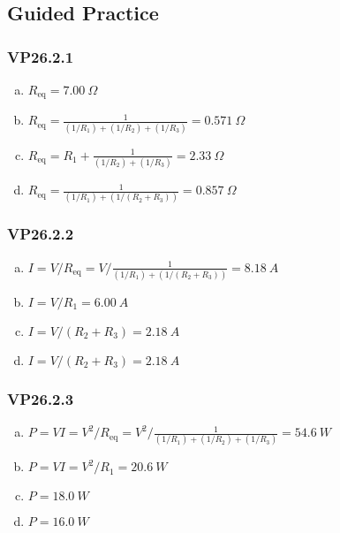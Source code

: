 \documentclass{article}
\begin{document}
\subsection{Guided Practice}

\subsubsection{VP26.2.1}

\begin{enumerate}[(a)]
  \item $R_\textrm{eq} = \qty{7.00}{\Omega}$

  \item $R_\textrm{eq} = \frac{1}{(1 / R_1) + (1 / R_2) + (1 / R_3)} = \qty{0.571}{\Omega}$

  \item $R_\textrm{eq} = R_1 + \frac{1}{(1 / R_2) + (1 / R_3)} = \qty{2.33}{\Omega}$

  \item $R_\textrm{eq} = \frac{1}{(1 / R_1) + (1 / (R_2 + R_3))} = \qty{0.857}{\Omega}$
\end{enumerate}

\subsubsection{VP26.2.2}

\begin{enumerate}[(a)]
  \item $I = V / R_\textrm{eq} = V / \frac{1}{(1 / R_1) + (1 / (R_2 + R_3))} = \qty{8.18}{A}$

  \item $I = V / R_1 = \qty{6.00}{A}$

  \item $I = V / (R_2 + R_3) = \qty{2.18}{A}$

  \item $I = V / (R_2 + R_3) = \qty{2.18}{A}$
\end{enumerate}

\subsubsection{VP26.2.3}

\begin{enumerate}[(a)]
  \item $P = V I = V^2 / R_\textrm{eq} = V^2 / \frac{1}{(1 / R_1) + (1 / R_2) + (1 / R_3)} = \qty{54.6}{W}$

  \item $P = V I = V^2 / R_1 = \qty{20.6}{W}$

  \item $P = \qty{18.0}{W}$

  \item $P = \qty{16.0}{W}$
\end{enumerate}
\end{document}
